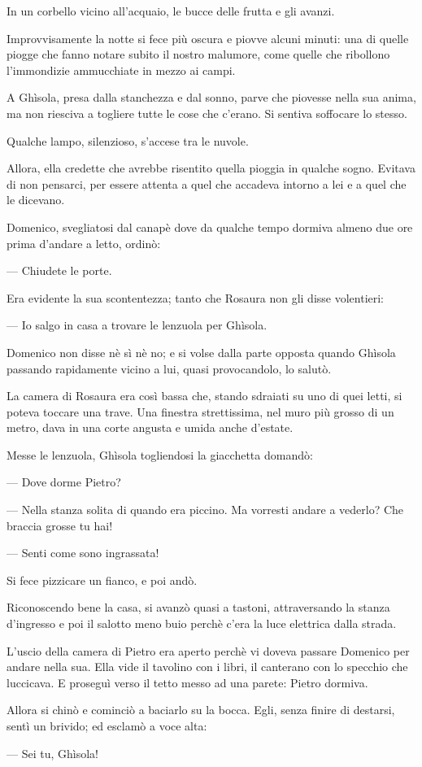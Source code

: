 In un corbello vicino all’acquaio, le bucce delle frutta e gli avanzi.

Improvvisamente la notte si fece più oscura e piovve alcuni minuti: una di quelle piogge che fanno notare subito il nostro malumore, come quelle che ribollono l’immondizie ammucchiate in mezzo ai campi.

A Ghìsola, presa dalla stanchezza e dal sonno, parve che piovesse nella sua anima, ma non riesciva a togliere tutte le cose che c’erano. Si sentiva soffocare lo stesso.

Qualche lampo, silenzioso, s’accese tra le nuvole.

Allora, ella credette che avrebbe risentito quella pioggia in qualche sogno. Evitava di non pensarci, per essere attenta a quel che accadeva intorno a lei e a quel che le dicevano.

Domenico, svegliatosi dal canapè dove da qualche tempo dormiva almeno due ore prima d'andare a letto, ordinò:

— Chiudete le porte.

Era evidente la sua scontentezza; tanto che Rosaura non gli disse volentieri:

— Io salgo in casa a trovare le lenzuola per Ghìsola.

Domenico non disse nè sì nè no; e si volse dalla parte opposta quando Ghìsola passando rapidamente vicino a lui, quasi provocandolo, lo salutò.

La camera di Rosaura era così bassa che, stando sdraiati su uno di quei letti, si poteva toccare una trave. Una finestra strettissima, nel muro più grosso di un metro, dava in una corte angusta e umida anche d'estate.

Messe le lenzuola, Ghìsola togliendosi la giacchetta domandò:

— Dove dorme Pietro?

— Nella stanza solita di quando era piccino. Ma vorresti andare a vederlo? Che braccia grosse tu hai!

— Senti come sono ingrassata!

Si fece pizzicare un fianco, e poi andò.

Riconoscendo bene la casa, si avanzò quasi a tastoni, attraversando la stanza d'ingresso e poi il salotto meno buio perchè c'era la luce elettrica dalla strada.

L'uscio della camera di Pietro era aperto perchè vi doveva passare Domenico per andare nella sua. Ella vide il tavolino con i libri, il canterano con lo specchio che luccicava. E proseguì verso il tetto messo ad una parete: Pietro dormiva.

Allora si chinò e cominciò a baciarlo su la bocca. Egli, senza finire di destarsi, sentì un brivido; ed esclamò a voce alta:

— Sei tu, Ghìsola!
